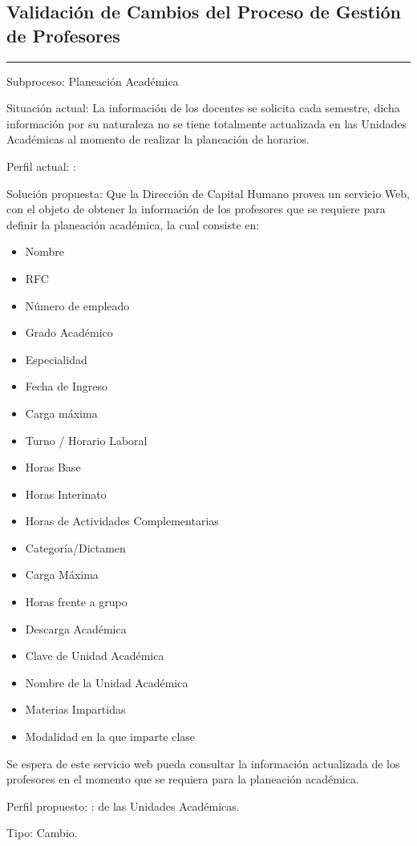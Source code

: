 \subsection{Validación de Cambios del Proceso de Gestión de Profesores}
\label{section:PF-GP:validacion}

\hrule
\vspace{0.2cm}
\begin{Cdescription}
	\item[Subproceso:] Planeación Académica 
	\item[Situación actual:] La información de los docentes se solicita cada semestre, dicha información por su naturaleza no se tiene totalmente actualizada en las Unidades Académicas al momento de realizar la planeación de horarios. 
	\item[Perfil actual:] :
	\item[Solución propuesta:] 
	Que la Dirección de Capital Humano provea un servicio Web, con el objeto de obtener la información de los profesores que se requiere para definir la planeación académica, la cual consiste en:
	\begin{itemize}
		\item Nombre 
		\item RFC
		\item Número de empleado
		\item Grado Académico
		\item Especialidad
		\item Fecha de Ingreso
		\item Carga máxima 
		\item Turno / Horario Laboral
		\item Horas Base
		\item Horas Interinato
		\item Horas de Actividades Complementarias
		\item Categoría/Dictamen
		\item Carga Máxima
		\item Horas frente a grupo
	    \item Descarga Académica
		\item Clave de Unidad Académica
		\item Nombre de la Unidad Académica
		\item Materias Impartidas
		\item Modalidad en la que imparte clase
	\end{itemize}
Se espera de este servicio web pueda consultar la información actualizada de los profesores en el momento que se requiera para la planeación académica.  

	\item[Perfil propuesto:] :  de las Unidades Académicas.
	\item[Tipo:] Cambio.
\end{Cdescription}

